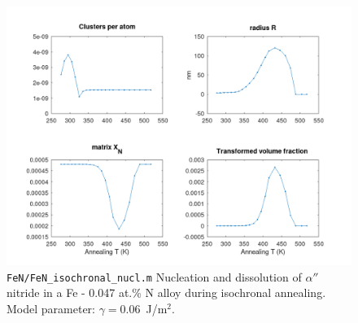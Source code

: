 \documentclass[12pt,a4paper]{article}
\begin{document}
\begin{figure}[b]
\centering
\includegraphics[width=\textwidth]{../FeN/FeN_isochronal_nucl.png} 
\caption{\texttt{FeN/FeN\_isochronal\_nucl.m} Nucleation and dissolution of $\alpha ''$ nitride in a Fe - 0.047 at.\% N alloy during isochronal annealing. Model parameter: $\gamma = 0.06$~J/m$^2$. }
\end{figure}

\pagebreak
\FloatBarrier



 


%
\end{document}
